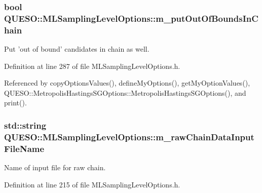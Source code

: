 \hypertarget{class_q_u_e_s_o_1_1_m_l_sampling_level_options_acf244c6ea5d1ac9c61d19d1d8f24fd8c}{
\subsubsection[{m\-\_\-put\-Out\-Of\-Bounds\-In\-Chain}]{\setlength{\rightskip}{0pt plus 5cm}bool Q\-U\-E\-S\-O\-::\-M\-L\-Sampling\-Level\-Options\-::m\-\_\-put\-Out\-Of\-Bounds\-In\-Chain}}\label{class_q_u_e_s_o_1_1_m_l_sampling_level_options_acf244c6ea5d1ac9c61d19d1d8f24fd8c}


Put 'out of bound' candidates in chain as well. 



Definition at line 287 of file M\-L\-Sampling\-Level\-Options.\-h.



Referenced by copy\-Options\-Values(), define\-My\-Options(), get\-My\-Option\-Values(), Q\-U\-E\-S\-O\-::\-Metropolis\-Hastings\-S\-G\-Options\-::\-Metropolis\-Hastings\-S\-G\-Options(), and print().

\hypertarget{class_q_u_e_s_o_1_1_m_l_sampling_level_options_a192498743c73fa9244c8652530beebb2}{
\subsubsection[{m\-\_\-raw\-Chain\-Data\-Input\-File\-Name}]{\setlength{\rightskip}{0pt plus 5cm}std\-::string Q\-U\-E\-S\-O\-::\-M\-L\-Sampling\-Level\-Options\-::m\-\_\-raw\-Chain\-Data\-Input\-File\-Name}}\label{class_q_u_e_s_o_1_1_m_l_sampling_level_options_a192498743c73fa9244c8652530beebb2}


Name of input file for raw chain. 



Definition at line 215 of file M\-L\-Sampling\-Level\-Options.\-h.



